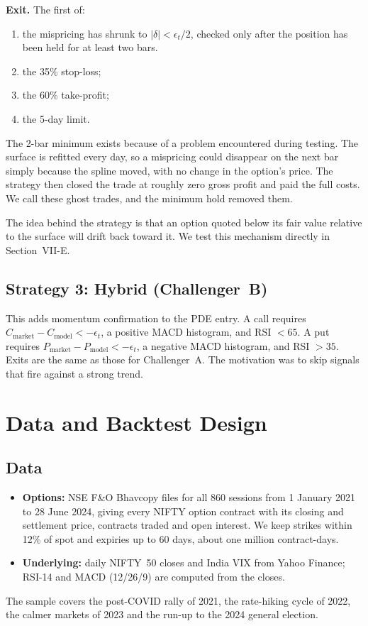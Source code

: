 \documentclass[10pt,journal,compsoc]{IEEEtran}
\begin{document}
\textbf{Exit.} The first of:
\begin{enumerate}
    \item the mispricing has shrunk to $|\delta| < \epsilon_t/2$, checked only after the position has been held for at least two bars.
    \item the 35\% stop-loss;
    \item the 60\% take-profit;
    \item the 5-day limit.
\end{enumerate}
The 2-bar minimum exists because of a problem encountered during testing. The surface is refitted every day, so a mispricing could disappear on the next bar simply because the spline moved, with no change in the option's price. The strategy then closed the trade at roughly zero gross profit and paid the full costs. We call these ghost trades, and the minimum hold removed them.

The idea behind the strategy is that an option quoted below its fair value relative to the surface will drift back toward it. We test this mechanism directly in Section~VII-E.

\subsection{Strategy 3: Hybrid (Challenger~B)}
This adds momentum confirmation to the PDE entry. A call requires $C_{\text{market}} - C_{\text{model}} < -\epsilon_t$, a positive MACD histogram, and RSI $< 65$. A put requires $P_{\text{market}} - P_{\text{model}} < -\epsilon_t$, a negative MACD histogram, and RSI $> 35$. Exits are the same as those for Challenger~A. The motivation was to skip signals that fire against a strong trend.

\section{Data and Backtest Design}

\subsection{Data}
\begin{itemize}
    \item \textbf{Options:} NSE F\&O Bhavcopy files for all 860 sessions from 1 January 2021 to 28 June 2024, giving every NIFTY option contract with its closing and settlement price, contracts traded and open interest. We keep strikes within 12\% of spot and expiries up to 60 days, about one million contract-days.
    \item \textbf{Underlying:} daily NIFTY~50 closes and India VIX from Yahoo Finance; RSI-14 and MACD (12/26/9) are computed from the closes.
\end{itemize}
The sample covers the post-COVID rally of 2021, the rate-hiking cycle of 2022, the calmer markets of 2023 and the run-up to the 2024 general election.
\end{document}
